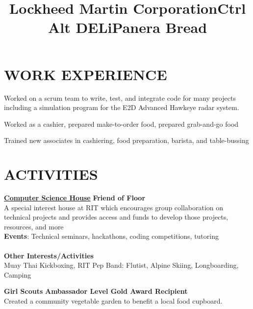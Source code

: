 \documentclass[line,margin]{res}
\begin{document}
\begin{resume}
\section{WORK EXPERIENCE}
\title{\textbf{Lockheed Martin Corporation}}
\begin{position}
    Worked on a scrum team to write, test, and integrate code for many projects including a simulation program for the E2D Advanced Hawkeye radar system.
\end{position}
\title{\textbf{Ctrl Alt DELi}}
\begin{position}
    Worked as a cashier, prepared make-to-order food, prepared grab-and-go food
\end{position}
\title{\textbf{Panera Bread}}
\begin{position}
    Trained new associates in cashiering, food preparation, barista, and table-bussing
\end{position}

\section{ACTIVITIES}
\href{https://csh.rit.edu}{\textbf{Computer Science House}}
\hfill
\textbf{Friend of Floor}\\
A special interest house at RIT which encourages group collaboration on technical 
projects and provides access and funds to develop those projects, resources, and more\\
\textbf{Events}: 
Technical seminars, hackathons, coding competitions, tutoring\\
\\\textbf{Other Interests/Activities}\\
Muay Thai Kickboxing, RIT Pep Band: Flutist, Alpine Skiing, Longboarding, Camping

\textbf{Girl Scouts} \hfill \textbf{Ambassador Level Gold Award Recipient}\\
Created a community vegetable garden to benefit a local food cupboard.

\end{resume}
\end{document}
